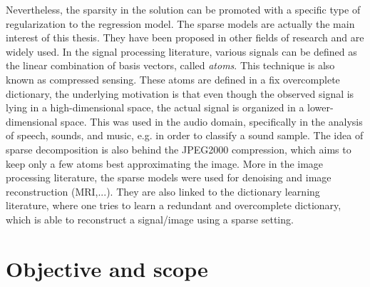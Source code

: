 Nevertheless, the sparsity in the solution can be promoted with a specific type of regularization to the regression model. The sparse models are actually the main interest of this thesis. They have been proposed in other fields of research and are widely used. In the signal processing literature, various signals can be defined as the linear combination of basis vectors, called \textit{atoms}. This technique is also known as compressed sensing. These atoms are defined in a fix overcomplete dictionary, the underlying motivation is that even though the observed signal is lying in a high-dimensional space, the actual signal is organized in a lower-dimensional space. This was used in the audio domain, specifically in the analysis of speech, sounds, and music, e.g. in order to classify a sound sample. The idea of sparse decomposition is also behind the JPEG2000 compression, which aims to keep only a few atoms best approximating the image. More in the image processing literature, the sparse models were used for denoising and image reconstruction (MRI,...). They are also linked to the dictionary learning literature, where one tries to learn a redundant and overcomplete dictionary, which is able to reconstruct a signal/image using a sparse setting.\\

\section*{Objective and scope}

